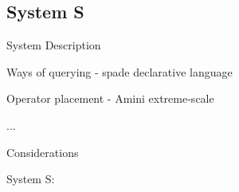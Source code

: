 \subsection*{System S}
\label{sec:system_s}

\begin{structure}
	\item System Description
	\item Ways of querying - spade declarative language
	\item Operator placement - Amini extreme-scale
	\item ...
	\item Considerations
\end{structure}

System S: \cite{ss-spc} \cite{ss-spade} \cite{ss-scale_up} \cite{extreme-scale-sps}

